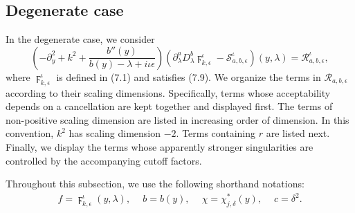 \documentclass[reqno,11pt]{amsart}
\numberwithin{equation}{section}
\newcommand{\p}{\partial}
\numberwithin{equation}{section} %
\begin{document}
\subsection{Degenerate case}
In the degenerate case, we consider
\begin{equation*}
    \left( -\p_y^2 + k^2 + \frac{b''(y)}{b(y) - \lambda  + i\iota \epsilon } \right) \left(\partial_\lambda ^a D_\lambda ^b\digamma_{k, \epsilon}^\iota -\mathcal{S}_{a,b,\epsilon}^\iota\right)(y,\lambda ) = \mathcal{R}_{a,b,\epsilon}^\iota,
\end{equation*}
where $\digamma_{k, \epsilon}^\iota$ is defined in (7.1) and satisfies (7.9). We organize the terms in $\mathcal{R}_{a,b,\epsilon}$ according to their scaling dimensions. Specifically, terms whose acceptability depends on a cancellation are kept together and displayed first. The terms of non-positive scaling dimension are listed in increasing order of dimension. In this convention, $k^2$ has scaling dimension $-2$. Terms containing $r$ are listed next. Finally, we display the terms whose apparently stronger singularities are controlled by the accompanying cutoff factors.


Throughout this subsection, we use the following shorthand notations:
\begin{align*}
   f=\digamma^{\iota}_{k,\epsilon}(y,\lambda),\quad\ b=b(y),\quad\ \chi=\chi_{j,\delta}^{\ast}(y),\quad\ c=\delta^2.
\end{align*}

\begingroup
\footnotesize
\end{document}
